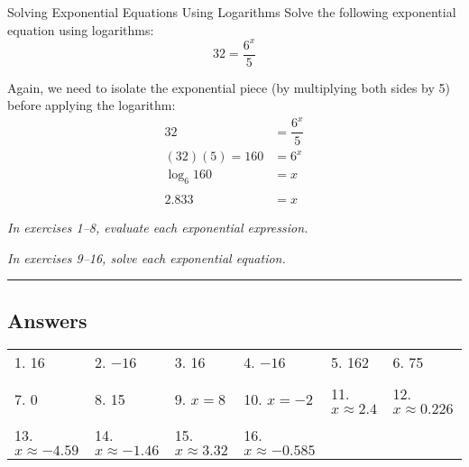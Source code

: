 \begin{example}{Solving Exponential Equations Using Logarithms}
Solve the following exponential equation using logarithms:
\[32 = \dfrac{6^x}{5}\]

\sol
Again, we need to isolate the exponential piece (by multiplying both sides by 5) before applying the logarithm:
\begin{align*}
32 &= \dfrac{6^x}{5}\\
(32)(5) = 160 &= 6^x\\
\log_6 160 &= x\\ \\
\boxed{2.833} &= x
\end{align*}
\end{example}

\begin{exercises}
\textit{In exercises 1--8, evaluate each exponential expression.}



\textit{In exercises 9--16, solve each exponential equation.}



\vspace*{0.25in}

{\color{blue!60!black} \rule{\textwidth}{3pt}}
\vspace*{0.25in}

\subsection{Answers}
\begin{tabularx}{\textwidth}{l l l l l l}
1. 16 & 2. $-16$ & 3. 16 & 4. $-16$ & 5. 162 & 6. 75\\ \\
7. 0 & 8. 15 & 9. $x=8$ & 10. $x=-2$ & 11. $x \approx 2.4$ & 12. $x \approx 0.226$\\ \\
13. $x \approx -4.59$ & 14. $x \approx -1.46$ & 15. $x \approx 3.32$ & 16. $x \approx -0.585$
\end{tabularx}
\end{exercises}












